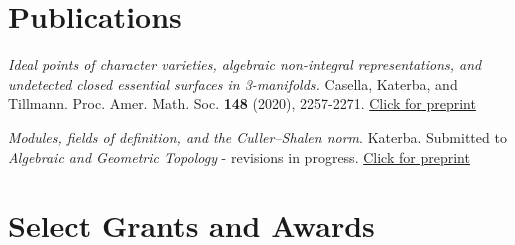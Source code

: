 \documentclass[12pt]{article}
\begin{document}
%
%
%

\section{Publications}

\textit{Ideal points of character varieties, algebraic non-integral representations, and undetected closed essential surfaces in 3-manifolds.} Casella, Katerba, and Tillmann. Proc. Amer. Math. Soc. \textbf{148} (2020), 2257-2271. \href{https://arxiv.org/abs/1808.02535}{Click for preprint}

\noindent \textit{Modules, fields of definition, and the Culler--Shalen norm}. Katerba. Submitted to \textit{Algebraic and Geometric Topology} - revisions in progress. \href{https://arxiv.org/abs/1805.04585}{Click for preprint}

\section{Select Grants and Awards}
\end{document}
